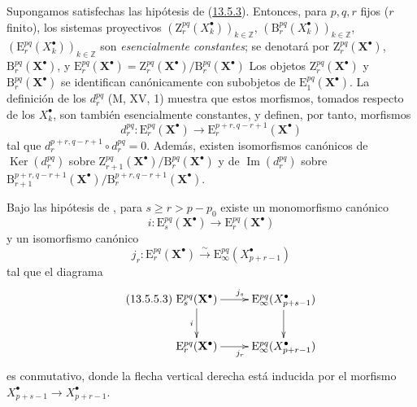 \begin{env}[13.5.4]
\label{0.13.5.4-fr}
Supongamos satisfechas las hipótesis de (\hyperref[0.13.5.3-fr]{13.5.3}). Entonces, para $p,q,r$ fijos ($r$ finito), los sistemas proyectivos $(\mathrm Z_r^{pq}(X_k^\bullet))_{k\in\mathbb Z}$, $(\mathrm B_r^{pq}(X_k^\bullet))_{k\in\mathbb Z}$, $(\mathrm E_r^{pq}(X_k^\bullet))_{k\in\mathbb Z}$ son \emph{esencialmente constantes}; se denotará por $\mathrm Z_r^{pq}(\mathbf X^\bullet)$,
$\mathrm B_r^{pq}(\mathbf X^\bullet)$, y
$\mathrm E_r^{pq}(\mathbf X^\bullet)=
\mathrm Z_r^{pq}(\mathbf X^\bullet)/
\mathrm B_r^{pq}(\mathbf X^\bullet)$
Los objetos $\mathrm Z_r^{pq}(\mathbf X^\bullet)$ y
$\mathrm B_r^{pq}(\mathbf X^\bullet)$ se identifican canónicamente con
subobjetos de $\mathrm E_1^{pq}(\mathbf X^\bullet)$.
La definición de los $d_r^{pq}$ (M, XV, 1) muestra que estos
morfismos, tomados respecto de los $X_k^\bullet$, son también esencialmente
constantes, y definen, por tanto, morfismos
\begin{equation}
\label{0.13.5.4.1-fr}
\tag{13.5.4.1}
d_r^{pq}:\mathrm E_r^{pq}(\mathbf X^\bullet)
\longrightarrow\mathrm E_r^{p+r,q-r+1}(\mathbf X^\bullet)
\end{equation}
tal que
$d_r^{p+r,q-r+1}\circ d_r^{pq}=0$.
Además, existen isomorfismos canónicos de
$\operatorname{Ker}(d_r^{pq})$ sobre
$\mathrm Z_{r+1}^{pq}(\mathbf X^\bullet)/
\mathrm B_r^{pq}(\mathbf X^\bullet)$
y de $\operatorname{Im}(d_r^{pq})$ sobre
$\mathrm B_{r+1}^{p+r,q-r+1}(\mathbf X^\bullet)/
\mathrm B_r^{p+r,q-r+1}(\mathbf X^\bullet)$.
\end{env}

\begin{lemma}[13.5.5]
\label{0.13.5.5}
\label{0.13.5.5-fr}
Bajo las hipótesis de , para
$s\geq r>p-p_0$ existe un monomorfismo canónico
\begin{equation}
\label{0.13.5.5.1-fr}
\tag{13.5.5.1}
i:\mathrm E_s^{pq}(\mathbf X^\bullet)
\longrightarrow\mathrm E_r^{pq}(\mathbf X^\bullet)
\end{equation}
y un isomorfismo canónico
\begin{equation}
\label{0.13.5.5.2-fr}
\tag{13.5.5.2}
j_r:\mathrm E_r^{pq}(\mathbf X^\bullet)
\xrightarrow{\sim}\mathrm E_\infty^{pq}(X_{p+r-1}^\bullet)
\end{equation}
tal que el diagrama
\begin{equation}
\label{0.13.5.5.3-fr}
\tag{13.5.5.3}
\xymatrix{
\mathrm E_s^{pq}(\mathbf X^\bullet)\ar[r]^{j_s}\ar[d]_i
&\mathrm E_\infty^{pq}(X_{p+s-1}^\bullet)\ar[d]\\
\mathrm E_r^{pq}(\mathbf X^\bullet)\ar[r]_{j_r}
&\mathrm E_\infty^{pq}(X_{p+r-1}^\bullet)
}
\end{equation}
es conmutativo, donde la flecha vertical derecha está inducida por el
morfismo
$X_{p+s-1}^\bullet\to X_{p+r-1}^\bullet$.
\end{lemma}

